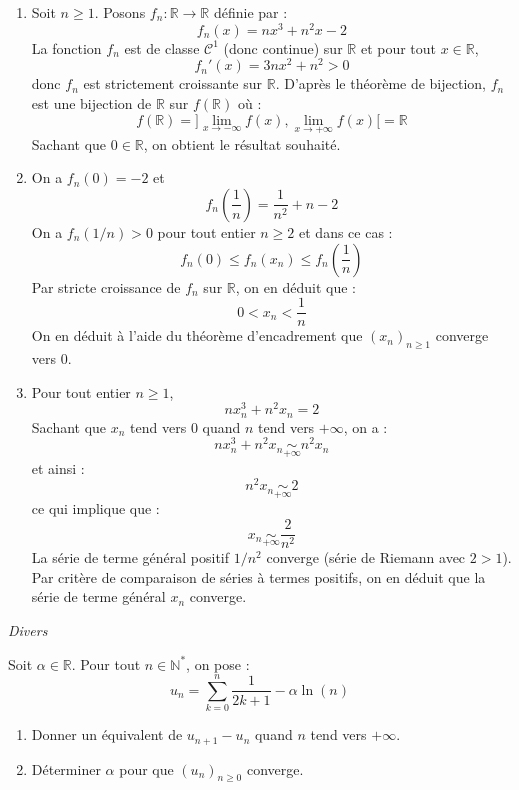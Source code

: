 \documentclass[a4paper,10pt]{report}
\begin{document}
\begin{enumerate}
\item Soit $n \geq 1$. Posons $f_n : \mathbb{R} \rightarrow \mathbb{R}$ définie par :
$$ f_n(x) = nx^3+n^2x-2$$
La fonction $f_n$ est de classe $\mathcal{C}^1$ (donc continue) sur $\mathbb{R}$ et pour tout $x \in \mathbb{R}$,
$$ f_n'(x) = 3nx^2 + n^2 >0$$
donc $f_n$ est strictement croissante sur $\mathbb{R}$. D'après le théorème de bijection, $f_n$ est une bijection de $\mathbb{R}$ sur $f(\mathbb{R})$ où :
$$ f(\mathbb{R}) =  ]\lim_{x \rightarrow - \infty} f(x), \lim_{x \rightarrow +\infty} f(x)[= \mathbb{R}$$
Sachant que $0 \in \mathbb{R}$, on obtient le résultat souhaité.
\item On a $f_n(0)=-2$ et 
$$ f_n \left( \dfrac{1}{n} \right) = \dfrac{1}{n^2} + n -2$$
On a $f_n(1/n)>0$ pour tout entier $n \geq 2$ et dans ce cas :
$$ f_n(0) \leq f_n(x_n) \leq f_n \left( \dfrac{1}{n} \right) $$
Par stricte croissance de $f_n$ sur $\mathbb{R}$, on en déduit que :
$$ 0 < x_n < \dfrac{1}{n}$$
On en déduit à l'aide du théorème d'encadrement que $(x_n)_{n \geq 1}$ converge vers $0$.
\item Pour tout entier $n \geq 1$,
$$ nx_n^3+n^2x_n=2$$
Sachant que $x_n$ tend vers $0$ quand $n$ tend vers $+ \infty$, on a :
$$ nx_n^3+n^2x_n \underset{+ \infty}{\sim} n^2 x_n$$
et ainsi :
$$ 
n^2 x_n \underset{+ \infty}{\sim} 2$$
ce qui implique que :
$$ x_n \underset{+ \infty}{\sim}  \dfrac{2}{n^2}$$
La série de terme général positif $1/n^2$ converge (série de Riemann avec $2>1$). Par critère de comparaison de séries à termes positifs, on en déduit que la série de terme général $x_n$ converge.
\end{enumerate}

\medskip


\begin{center}
\textit{{ {\large Divers}}}
\end{center}

\medskip

\begin{Exercice}{} Soit $\alpha \in \mathbb{R}$. Pour tout $n \in \mathbb{N}^*$, on pose :
$$ u_n = \sum_{k=0}^n \frac{1}{2k+1} -  \alpha \ln(n)$$

\begin{enumerate}
\item Donner un équivalent de $u_{n+1}-u_n$ quand $n$ tend vers $+ \infty$.
\item Déterminer $\alpha$ pour que $(u_n)_{n \geq 0}$ converge.
\end{enumerate}
\end{Exercice} 
\end{document}

